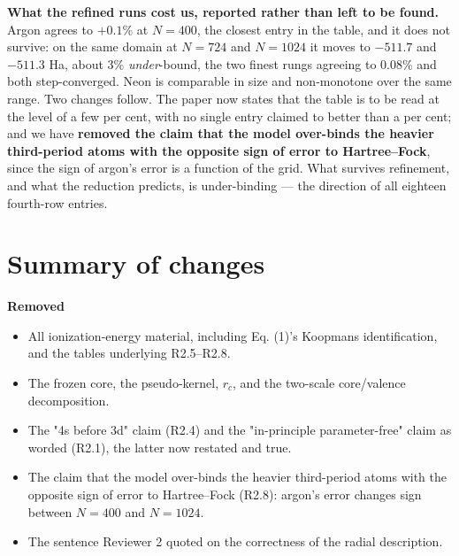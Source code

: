 \documentclass[11pt,a4paper]{article}
\begin{document}
\textbf{What the refined runs cost us, reported rather than left to be found.} Argon agrees to $+0.1\%$ at
$N=400$, the closest entry in the table, and it does not survive: on the same domain at $N=724$ and
$N=1024$ it moves to $-511.7$ and $-511.3$ Ha, about 3\% \emph{under}-bound, the two finest rungs agreeing
to 0.08\% and both step-converged. Neon is comparable in size and non-monotone over the same range.
Two changes follow. The paper now states that the table is to be read at the level of a few per cent,
with no single entry claimed to better than a per cent; and we have \textbf{removed the claim that the
model over-binds the heavier third-period atoms with the opposite sign of error to Hartree--Fock},
since the sign of argon's error is a function of the grid. What survives refinement, and what the
reduction predicts, is under-binding --- the direction of all eighteen fourth-row entries.

\section*{Summary of changes}

\textbf{Removed}
\begin{itemize}
  \item All ionization-energy material, including Eq. (1)'s Koopmans identification, and the tables
    underlying R2.5--R2.8.
  \item The frozen core, the pseudo-kernel, $r_c$, and the two-scale core/valence decomposition.
  \item The "4s before 3d" claim (R2.4) and the "in-principle parameter-free" claim as worded (R2.1),
    the latter now restated and true.
  \item The claim that the model over-binds the heavier third-period atoms with the opposite sign of error
    to Hartree--Fock (R2.8): argon's error changes sign between $N=400$ and $N=1024$.
  \item The sentence Reviewer 2 quoted on the correctness of the radial description.
\end{itemize}
\end{document}
